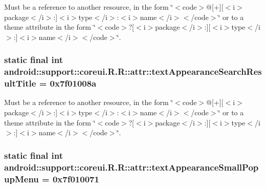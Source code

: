 Must be a reference to another resource, in the form \char`\"{}$<$code$>$@\mbox{[}+\mbox{]}\mbox{[}$<$i$>$package$<$/i$>$:\mbox{]}$<$i$>$type$<$/i$>$:$<$i$>$name$<$/i$>$$<$/code$>$\char`\"{} or to a theme attribute in the form \char`\"{}$<$code$>$?\mbox{[}$<$i$>$package$<$/i$>$:\mbox{]}\mbox{[}$<$i$>$type$<$/i$>$:\mbox{]}$<$i$>$name$<$/i$>$$<$/code$>$\char`\"{}. \hypertarget{classandroid_1_1support_1_1coreui_1_1_r_1_1attr_230c2e9c933dcc5952040d6ae24d9508}{
\subsubsection[{textAppearanceSearchResultTitle}]{\setlength{\rightskip}{0pt plus 5cm}static final int android::support::coreui.R.R::attr::textAppearanceSearchResultTitle = 0x7f01008a}}
\label{classandroid_1_1support_1_1coreui_1_1_r_1_1attr_230c2e9c933dcc5952040d6ae24d9508}


Must be a reference to another resource, in the form \char`\"{}$<$code$>$@\mbox{[}+\mbox{]}\mbox{[}$<$i$>$package$<$/i$>$:\mbox{]}$<$i$>$type$<$/i$>$:$<$i$>$name$<$/i$>$$<$/code$>$\char`\"{} or to a theme attribute in the form \char`\"{}$<$code$>$?\mbox{[}$<$i$>$package$<$/i$>$:\mbox{]}\mbox{[}$<$i$>$type$<$/i$>$:\mbox{]}$<$i$>$name$<$/i$>$$<$/code$>$\char`\"{}. \hypertarget{classandroid_1_1support_1_1coreui_1_1_r_1_1attr_f3d46d27eefa62351d71d2c7f0f36f38}{
\subsubsection[{textAppearanceSmallPopupMenu}]{\setlength{\rightskip}{0pt plus 5cm}static final int android::support::coreui.R.R::attr::textAppearanceSmallPopupMenu = 0x7f010071}}
\label{classandroid_1_1support_1_1coreui_1_1_r_1_1attr_f3d46d27eefa62351d71d2c7f0f36f38}


